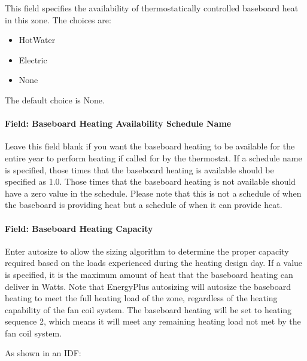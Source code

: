 This field specifies the availability of thermostatically controlled baseboard heat in this zone. The choices are:

\begin{itemize}
\item
  HotWater
\item
  Electric
\item
  None
\end{itemize}

The default choice is None.

\paragraph{Field: Baseboard Heating Availability Schedule Name}\label{field-baseboard-heating-availability-schedule-name-1}

Leave this field blank if you want the baseboard heating to be available for the entire year to perform heating if called for by the thermostat. If a schedule name is specified, those times that the baseboard heating is available should be specified as 1.0. Those times that the baseboard heating is not available should have a zero value in the schedule. Please note that this is not a schedule of when the baseboard is providing heat but a schedule of when it can provide heat.

\paragraph{Field: Baseboard Heating Capacity}\label{field-baseboard-heating-capacity-1}

Enter autosize to allow the sizing algorithm to determine the proper capacity required based on the loads experienced during the heating design day. If a value is specified, it is the maximum amount of heat that the baseboard heating can deliver in Watts. Note that EnergyPlus autosizing will autosize the baseboard heating to meet the full heating load of the zone, regardless of the heating capability of the fan coil system. The baseboard heating will be set to heating sequence 2, which means it will meet any remaining heating load not met by the fan coil system.

As shown in an IDF:

